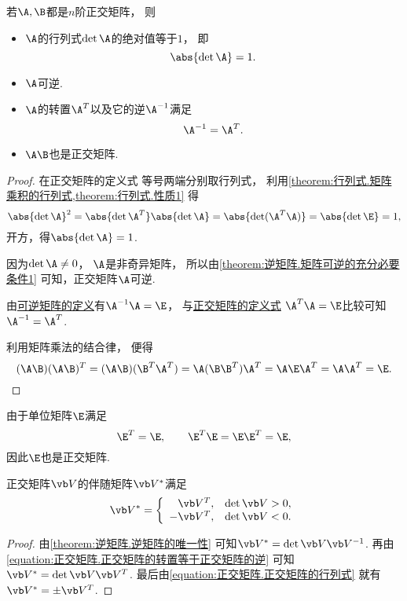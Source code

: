 \begin{property}
若\(\A,\B\)都是\(n\)阶正交矩阵，
则\begin{itemize}
	\item \(\A\)的行列式\(\det\A\)的绝对值等于\(1\)，
	即\begin{equation}\label{equation:正交矩阵.正交矩阵的行列式}
		\abs{\det\A}=1.
	\end{equation}

	\item \(\A\)可逆.

	\item \(\A\)的转置\(\A^T\)以及它的逆\(\A^{-1}\)满足
	\begin{equation}\label{equation:正交矩阵.正交矩阵的转置等于正交矩阵的逆}
		\A^{-1}=\A^T.
	\end{equation}

	\item \(\A\B\)也是正交矩阵.
\end{itemize}
\begin{proof}
在正交矩阵的定义式  等号两端分别取行列式，
利用\cref{theorem:行列式.矩阵乘积的行列式,theorem:行列式.性质1} 得\[
	\abs{\det\A}^2
	=\abs{\det\A^T} \abs{\det\A\vphantom{^T}}
	=\abs{\det(\A^T \A)}
	=\abs{\det\E}
	=1,
\]
开方，得\(\abs{\det\A}=1\).

因为\(\det\A\neq0\)，
\(\A\)是非奇异矩阵，
所以由\cref{theorem:逆矩阵.矩阵可逆的充分必要条件1} 可知，正交矩阵\(\A\)可逆.

由\hyperref[definition:可逆矩阵.可逆矩阵的定义]{可逆矩阵的定义}有\(\A^{-1}\A=\E\)，
与\hyperref[equation:正交矩阵.正交矩阵的定义式]{正交矩阵的定义式}
\(\A^T\A=\E\)比较可知\(\A^{-1}=\A^T\).

利用矩阵乘法的结合律，
便得\[
	(\A\B)(\A\B)^T
	= (\A\B)(\B^T\A^T)
	= \A(\B\B^T)\A^T
	= \A\E\A^T
	= \A\A^T
	= \E.
	\qedhere
\]
\end{proof}
\end{property}

\begin{example}
由于单位矩阵\(\E\)满足\[
	\E^T=\E, \qquad
	\E^T \E = \E \E^T = \E,
\]
因此\(\E\)也是正交矩阵.
\end{example}

\begin{proposition}
正交矩阵\(\Q\)的伴随矩阵\(\Q^*\)满足\[
	\Q^*
	= \left\{ \begin{array}{rc}
		\Q^T, & \det\Q>0, \\
		-\Q^T, & \det\Q<0.
	\end{array} \right.
\]
\begin{proof}
由\cref{theorem:逆矩阵.逆矩阵的唯一性}
可知\(\Q^* = \det\Q \Q^{-1}\).
再由\cref{equation:正交矩阵.正交矩阵的转置等于正交矩阵的逆}
可知\(\Q^* = \det\Q \Q^T\).
最后由\cref{equation:正交矩阵.正交矩阵的行列式}
就有\(\Q^* = \pm\Q^T\).
\end{proof}
\end{proposition}

